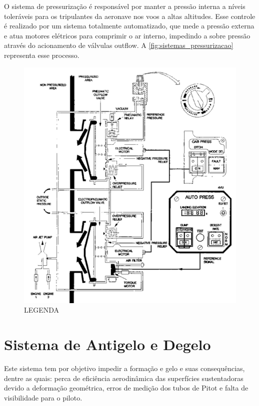 O sistema de pressurização é responsável por manter a pressão interna a níveis toleráveis para os tripulantes da aeronave nos voos a altas altitudes.
Esse controle é realizado por um sistema totalmente automatizado, que mede a pressão externa e atua motores elétricos para comprimir o ar interno, impedindo a sobre pressão através do acionamento de válvulas outflow.
A \autoref{fig:sistemas_pressurizacao} representa esse processo.

\begin{figure}
\includegraphics[width=\textwidth]{images/parte3/sistemas_pressurizacao.png}
\caption{LEGENDA}
\label{fig:sistemas_pressurizacao}
\end{figure}


\section{Sistema de Antigelo e Degelo}

Este sistema tem por objetivo impedir a formação e gelo e suas consequências, dentre as quais: perca de eficiência aerodinâmica das superfícies sustentadoras devido a deformação geométrica, erros de medição dos tubos de Pitot e falta de visibilidade para o piloto.

